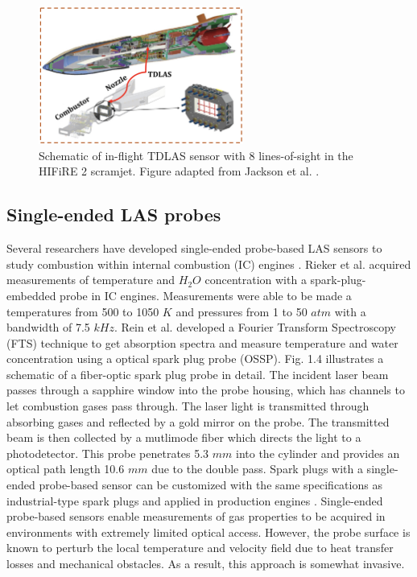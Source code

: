 \begin{figure}[ht]
    \centering
        \includegraphics[width=0.6\textwidth]{fig/ch1_fig6_v2.png}
        \caption{Schematic of in-flight TDLAS sensor with 8 lines-of-sight in the HIFiRE 2 scramjet. Figure adapted from Jackson et al. \cite{Jackson2015}.}
    \label{fig:ch1_3}
\end{figure}


\subsection{Single-ended LAS probes}
Several researchers have developed single-ended probe-based LAS sensors to study combustion within internal combustion (IC) engines \cite{Melin2017, RIEKER20073041, Jeffries2010, Witzel2013, Bürkle2018}. Rieker et al. \cite{RIEKER20073041} acquired measurements of temperature and $H_2O$ concentration with a spark-plug-embedded probe in IC engines. Measurements were able to be made a temperatures from 500 to 1050 $K$ and pressures from 1 to 50 $atm$ with a bandwidth of 7.5 $kHz$. Rein et al. \cite{Rein:10} developed a Fourier Transform Spectroscopy (FTS) technique to get absorption spectra and measure temperature and water concentration using a optical spark plug probe (OSSP). Fig. 1.4 illustrates a schematic of a fiber-optic spark plug probe in detail. The incident laser beam passes through a sapphire window into the probe housing, which has channels to let combustion gases pass through. The laser light is transmitted through absorbing gases and reflected by a gold mirror on the probe. The transmitted beam is then collected by a mutlimode fiber which directs the light to a photodetector. This probe penetrates 5.3 $mm$ into the cylinder and provides an optical path length 10.6 $mm$ due to the double pass. Spark plugs with a single-ended probe-based sensor can be customized with the same specifications as industrial-type spark plugs and applied in production engines \cite{Jeffries2010}. Single-ended probe-based sensors enable measurements of gas properties to be acquired in environments with extremely limited optical access. However, the probe surface is known to perturb the local temperature and velocity field due to heat transfer losses and mechanical obstacles. As a result, this approach is somewhat invasive.

